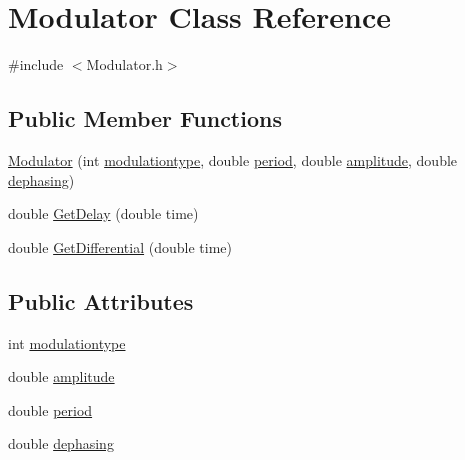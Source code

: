 \hypertarget{classModulator}{
\section{Modulator Class Reference}
\label{classModulator}
}


{\ttfamily \#include $<$Modulator.h$>$}

\subsection*{Public Member Functions}
\begin{DoxyCompactItemize}
\item 
\hyperlink{classModulator_a9988f2b9041384d86b58fd8ff6a2ab30}{Modulator} (int \hyperlink{classModulator_a86625d01ba4ca81cb15fd212c4fa72a8}{modulationtype}, double \hyperlink{classModulator_af9a5cbb6681a9493f97ad0a2104b883f}{period}, double \hyperlink{classModulator_a4c384ef6fe79785c8750710ae2dc5be6}{amplitude}, double \hyperlink{classModulator_aa24a21030bcf630c28a63506e07e3f3a}{dephasing})
\item 
double \hyperlink{classModulator_a10584ade4c8b9e10aaa78a8eed83261b}{GetDelay} (double time)
\item 
double \hyperlink{classModulator_aed0bf37696c14ff9c4231993dfe306dd}{GetDifferential} (double time)
\end{DoxyCompactItemize}
\subsection*{Public Attributes}
\begin{DoxyCompactItemize}
\item 
int \hyperlink{classModulator_a86625d01ba4ca81cb15fd212c4fa72a8}{modulationtype}
\item 
double \hyperlink{classModulator_a4c384ef6fe79785c8750710ae2dc5be6}{amplitude}
\item 
double \hyperlink{classModulator_af9a5cbb6681a9493f97ad0a2104b883f}{period}
\item 
double \hyperlink{classModulator_aa24a21030bcf630c28a63506e07e3f3a}{dephasing}
\end{DoxyCompactItemize}
